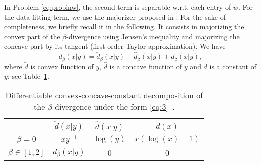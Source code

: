 \documentclass[a4paper, 11pt]{article}
\begin{document}
In Problem \eqref{eq:probinw}, the second term is separable w.r.t. each entry of $w$.
For the data fitting term, we use the majorizer proposed in \cite{fevotte2011algorithms}. For the sake of completeness, we briefly recall it in the following. It consists in majorizing the convex part of the $\beta$-divergence using Jensen's inequality and majorizing the concave part by its tangent (first-order Taylor approximation). We have 
  \begin{equation}\label{eq:3}
  d_{\beta}(x|y)= \check{d}_{\beta}(x|y)+\hat{d}_{\beta}(x|y)+\bar{d}_{\beta}(x|y), 
  \end{equation}
where $\check{d}$ is convex function of $y$, $\hat{d}$ is a concave function of $y$ and $\bar{d}$ is a constant of $y$; see Table~\ref{table:conv_concav_decomp}.  
\begin{center}
\begin{table}[h!]
\begin{center}
\caption{Differentiable convex-concave-constant decomposition of the $\beta$-divergence under the form \eqref{eq:3}~\cite{fevotte2011algorithms}. }
\label{table:conv_concav_decomp}
\begin{tabular}{|c|c|c|c|}
\hline 
      & $\check{d}(x|y)$  &  $\hat{d}(x|y)$ & $\bar{d}(x)$   \\  \hline 
 $\beta=0$      
 & $xy^{-1}$     & $\log(y)$  & $x(\log(x)-1)$  \\
 $\beta \in [1,2] $ 
 & $d_{\beta}(x|y)$ & 0 & 0    \\ \hline  
\end{tabular} 
\end{center}
\end{table}
\end{center}
\end{document}
